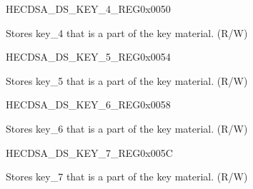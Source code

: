 \begin{register}{H}{ECDSA\_DS\_KEY\_4\_REG}{0x0050}\label{regdesc:ECDSADSKEY4REG}
%
\regnewline%
\begin{regdesc}\begin{reglist}
\label{fielddesc:ECDSADSKEY4}\item [ECDSA\_DS\_KEY\_4] Stores key\_4 that is a part of the key material. (R/W)
\end{reglist}\end{regdesc}
\end{register}


\begin{register}{H}{ECDSA\_DS\_KEY\_5\_REG}{0x0054}\label{regdesc:ECDSADSKEY5REG}
%
\regnewline%
\begin{regdesc}\begin{reglist}
\label{fielddesc:ECDSADSKEY5}\item [ECDSA\_DS\_KEY\_5] Stores key\_5 that is a part of the key material. (R/W)
\end{reglist}\end{regdesc}
\end{register}


\begin{register}{H}{ECDSA\_DS\_KEY\_6\_REG}{0x0058}\label{regdesc:ECDSADSKEY6REG}
%
\regnewline%
\begin{regdesc}\begin{reglist}
\label{fielddesc:ECDSADSKEY6}\item [ECDSA\_DS\_KEY\_6] Stores key\_6 that is a part of the key material. (R/W)
\end{reglist}\end{regdesc}
\end{register}


\begin{register}{H}{ECDSA\_DS\_KEY\_7\_REG}{0x005C}\label{regdesc:ECDSADSKEY7REG}
%
\regnewline%
\begin{regdesc}\begin{reglist}
\label{fielddesc:ECDSADSKEY7}\item [ECDSA\_DS\_KEY\_7] Stores key\_7 that is a part of the key material. (R/W)
\end{reglist}\end{regdesc}
\end{register}


